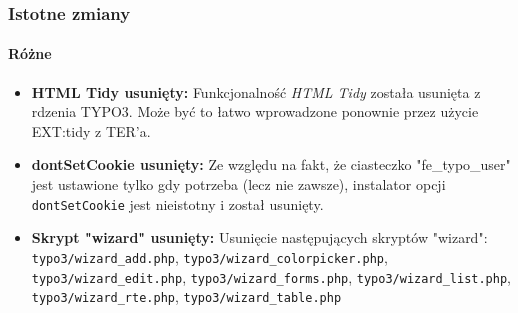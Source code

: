 \begin{frame}[fragile]
	\frametitle{Istotne zmiany}
	\framesubtitle{Różne}

	\begin{itemize}

		\item \textbf{HTML Tidy usunięty:}\newline
			\small
				Funkcjonalność \textit{HTML Tidy} została usunięta z rdzenia TYPO3. Może być to łatwo wprowadzone ponownie przez użycie EXT:tidy z TER'a.
			\normalsize

		\item \textbf{dontSetCookie usunięty:}\newline
			\small
				Ze względu na fakt, że ciasteczko "fe\_typo\_user" jest ustawione tylko gdy potrzeba (lecz nie zawsze), instalator opcji \texttt{dontSetCookie} jest nieistotny i został usunięty.
			\normalsize

		\item \textbf{Skrypt "wizard" usunięty:}\newline
			\small
				Usunięcie następujących skryptów "wizard":
				\texttt{typo3/wizard\_add.php}, \texttt{typo3/wizard\_colorpicker.php}, \texttt{typo3/wizard\_edit.php}, \texttt{typo3/wizard\_forms.php}, \texttt{typo3/wizard\_list.php}, \texttt{typo3/wizard\_rte.php}, \texttt{typo3/wizard\_table.php}
			\normalsize

	\end{itemize}
	
\end{frame}


